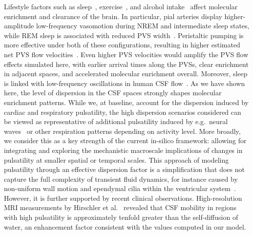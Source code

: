 \documentclass[fleqn,10pt]{wlscirep}
\begin{document}
Lifestyle factors such as sleep~\cite{xie2013sleep, miao2024brain,
  bojarskaite2023sleep, eide2021sleep, vinje2023human,
  hauglund2025norepinephrine, larsen2024sleep},
exercise~\cite{holstein2018voluntary, yildiz2022immediate}, and
alcohol intake~\cite{lundgaard2018beneficial} affect molecular
enrichment and clearance of the brain. In particular, pial arteries
display higher-amplitude low-frequency vasomotion during NREM and
intermediate sleep states, while REM sleep is associated with reduced
PVS width~\cite{bojarskaite2023sleep}. Peristaltic pumping is more
effective under both of these configurations, resulting in higher
estimated net PVS flow velocities~\cite{gjerde2023directional}. Even
higher PVS velocities would amplify the PVS flow effects simulated
here, with earlier arrival times along the PVSs, clear enrichment in
adjacent spaces, and accelerated molecular enrichment
overall. Moreover, sleep is linked with low-frequency oscillations in
human CSF flow~\cite{fultz2019coupled}. As we have shown here, the
level of dispersion in the CSF spaces strongly shapes molecular
enrichment patterns. While we, at baseline, account for the dispersion
induced by cardiac and respiratory pulsatility, the high dispersion
scenarios considered can be viewed as representative of additional
pulsatility induced by e.g.~neural waves~\cite{fultz2019coupled,
  williams2023neural} or other respiration patterns depending on
activity level. More broadly, we consider this as a key strength of
the current in-silico framework: allowing for integrating and
exploring the mechanistic macroscale implications of changes in
pulsatility at smaller spatial or temporal scales.
This approach of modeling pulsatility through an effective dispersion factor is a simplification that does not capture the full complexity of transient fluid dynamics, for instance caused by non-uniform wall motion and ependymal cilia within the ventricular system~\cite{siyahhan2014flow}.
However, it is further supported by recent clinical observations. High-resolution MRI measurements by Hirschler et al.~\cite{hirschler2024region} revealed that CSF mobility in regions with high pulsatility is approximately tenfold greater than the self-diffusion of water, an enhancement factor consistent with the values computed in our model. 

\end{document}

